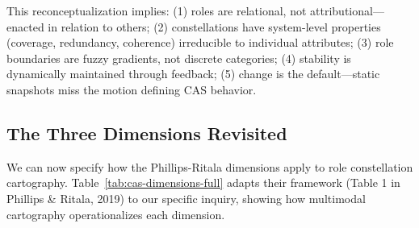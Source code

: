 \documentclass[../main.tex]{subfiles}
\begin{document}
\noindent This reconceptualization implies: (1) roles are relational, not attributional---enacted in relation to others; (2) constellations have system-level properties (coverage, redundancy, coherence) irreducible to individual attributes; (3) role boundaries are fuzzy gradients, not discrete categories; (4) stability is dynamically maintained through feedback; (5) change is the default---static snapshots miss the motion defining CAS behavior.

\subsection{The Three Dimensions Revisited}

We can now specify how the Phillips-Ritala dimensions apply to role constellation cartography. Table~\ref{tab:cas-dimensions-full} adapts their framework (Table 1 in Phillips \& Ritala, 2019) to our specific inquiry, showing how multimodal cartography operationalizes each dimension.
\end{document}
